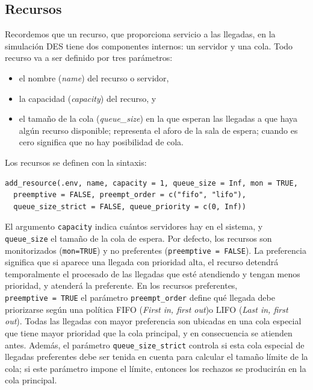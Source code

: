 \documentclass[
]{book}
\providecommand{\tightlist}{%
  \setlength{\itemsep}{0pt}\setlength{\parskip}{0pt}}
\theoremstyle{definition}
\theoremstyle{definition}
\theoremstyle{definition}
\theoremstyle{definition}
\theoremstyle{remark}
\begin{document}
\hypertarget{recursos}{%
\subsection{Recursos}\label{recursos}}

Recordemos que un recurso, que proporciona servicio a las llegadas, en la simulación DES tiene dos componentes internos: un servidor y una cola. Todo recurso va a ser definido por tres parámetros:

\begin{itemize}
\tightlist
\item
  el nombre (\emph{name}) del recurso o servidor,
\item
  la capacidad (\emph{capacity}) del recurso, y
\item
  el tamaño de la cola (\emph{queue\_size}) en la que esperan las llegadas a que haya algún recurso disponible; representa el aforo de la sala de espera; cuando es cero significa que no hay posibilidad de cola.
\end{itemize}

Los recursos se definen con la sintaxis:

\begin{verbatim}
add_resource(.env, name, capacity = 1, queue_size = Inf, mon = TRUE,
  preemptive = FALSE, preempt_order = c("fifo", "lifo"),
  queue_size_strict = FALSE, queue_priority = c(0, Inf))
\end{verbatim}

El argumento \texttt{capacity} indica cuántos servidores hay en el sistema, y \texttt{queue\_size} el tamaño de la cola de espera. Por defecto, los recursos son monitorizados (\texttt{mon=TRUE}) y no preferentes (\texttt{preemptive\ =\ FALSE}). La preferencia significa que si aparece una llegada con prioridad alta, el recurso detendrá temporalmente el procesado de las llegadas que esté atendiendo y tengan menos prioridad, y atenderá la preferente. En los recursos preferentes, \texttt{preemptive\ =\ TRUE} el parámetro \texttt{preempt\_order} define qué llegada debe priorizarse según una política FIFO (\emph{First in, first out})o LIFO (\emph{Last in, first out}). Todas las llegadas con mayor preferencia son ubicadas en una cola especial que tiene mayor prioridad que la cola principal, y en consecuencia se atienden antes. Además, el parámetro \texttt{queue\_size\_strict} controla si esta cola especial de llegadas preferentes debe ser tenida en cuenta para calcular el tamaño límite de la cola; si este parámetro impone el límite, entonces los rechazos se producirán en la cola principal.
\end{document}
